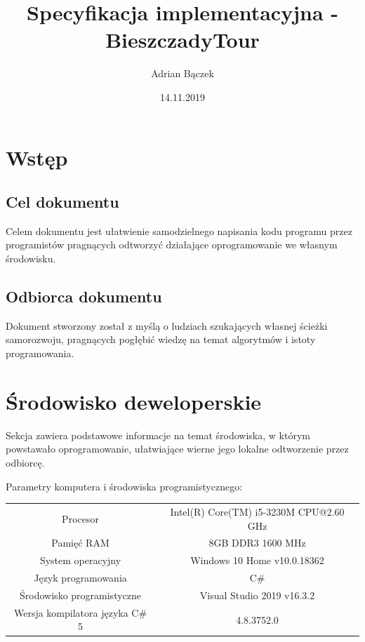 \documentclass[10pt,oneside]{article}
\title{Specyfikacja implementacyjna - BieszczadyTour}
\author{Adrian Bączek}
\date{14.11.2019}
\begin{document}
\maketitle


\thispagestyle{fancy}

\newpage


\tableofcontents

\newpage

\section{Wstęp}
\subsection{Cel dokumentu}
Celem dokumentu jest ułatwienie samodzielnego napisania kodu programu przez programistów pragnących odtworzyć działające oprogramowanie we własnym środowisku.
\subsection{Odbiorca dokumentu}
Dokument stworzony został z myślą o ludziach szukających własnej ścieżki samorozwoju, pragnących pogłębić wiedzę na temat algorytmów i istoty programowania. 

\section{Środowisko deweloperskie}
Sekcja zawiera podstawowe informacje na temat środowiska, w którym powstawało oprogramowanie, ułatwiające wierne jego lokalne odtworzenie przez odbiorcę.
\begin{center}
Parametry komputera i środowiska programistycznego:
\newline \newline
\begin{tabular}{|c|c|} \hline
	Procesor & Intel(R) Core(TM) i5-3230M CPU@2.60 GHz
	\\[10pt] Pamięć RAM & 8GB DDR3 1600 MHz
	\\[10pt] System operacyjny & Windows 10 Home v10.0.18362
	\\[10pt] Język programowania & C\#
	\\[10pt] Środowisko programistyczne & Visual Studio 2019 v16.3.2 
	\\[10pt] Wersja kompilatora języka C\# 5 & 4.8.3752.0 \\ \hline
\end{tabular}
\end{center}
\end{document}
